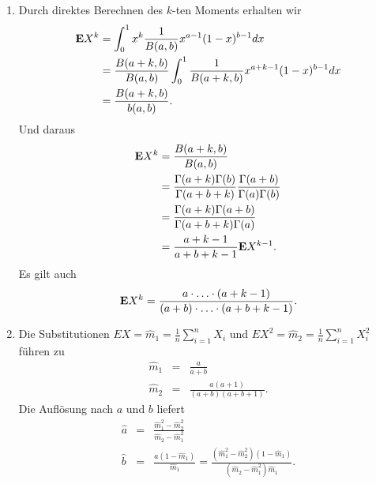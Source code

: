 \solution
\begin{enumerate}
    \item Durch direktes Berechnen des $k$-ten Moments erhalten wir 
        \begin{align*}
            \mathbf{E} X^k &= \int_{0}^{1} x^k \frac{1}{B(a,b)} x^{a-1}(1-x)^{b-1} dx \\
            &= \frac{B(a+k,b)}{B(a,b)} \int_{0}^{1} \frac{1}{B(a+k,b)} x^{a+k-1} (1-x)^{b-1} dx \\
            &= \frac{B(a+k,b)}{b(a,b)}.
        \end{align*}
        Und daraus
        \begin{align*}
            \mathbf{E} X^k &= \frac{B(a+k,b)}{B(a,b)} \\
            &= \frac{\Gamma(a+k)\Gamma(b)}{\Gamma(a+b+k)} \frac{\Gamma(a+b)}{\Gamma(a)\Gamma(b)} \\
            &= \frac{ \Gamma(a+k) \Gamma(a+b) }{\Gamma(a+b+k) \Gamma(a)} \\
            &= \frac{a+k-1}{a+b+k-1} \mathbf{E} X^{k-1}.
        \end{align*}
        Es gilt auch
        \begin{equation*}
            \mathbf{E} X^k = \frac{ a \cdot \ldots \cdot (a+k-1) }{ (a+b)\cdot \ldots \cdot (a+b+k-1)}.
        \end{equation*}
    \item Die Substitutionen $E X = \hat m_1 = \frac{1}{n} \sum_{i=1}^{n} X_i$ und 
        $E X^2 = \hat m_2 = \frac{1}{n} \sum_{i=1}^{n} X_i^2$ führen zu 
        \begin{eqnarray*}
            \hat m_1 &=&  \frac{a}{a+b} \\
            \hat m_2 &=&  \frac{ a(a+1) }{ (a+b)(a+b+1) }.
        \end{eqnarray*}
        Die Auflösung nach $a$ und $b$ liefert 
        \begin{eqnarray*}
            \hat a &=& \frac{ \hat m_1^2 - \hat m_2^2 }{ \hat m_2 - \hat m_1^2  } \\
            \hat b &=& \frac{a (1-\hat m_1)}{\hat m_1} = \frac{ (\hat m_1^2 - \hat m_2^2)(1-\hat m_1) }{(\hat m_2 - \hat m_1^2)\hat m_1}.
        \end{eqnarray*}
\end{enumerate}









